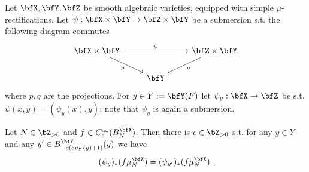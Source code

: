 \documentclass[12pt,a4paper]{amsart}%
\begin{document}
\begin{lemma}\label{lem:fiber.const}
    Let $\bfX,\bfY,\bfZ$ be smooth algebraic varieties, equipped with simple $\mu$-rectifications. Let $\psi:\bfX\times\bfY\to\bfZ\times\bfY$ be a submersion s.t. the following diagram commutes
    $$\begin{tikzcd}
\bfX\times \bfY \arrow[rr, "\psi"] \arrow[dr, "p"'] & & \bfZ\times \bfY \arrow[dl, "q"] \\
& \bfY &
\end{tikzcd}$$
    where $p,q$ are the projections. For $y\in Y:=\bfY(F)$ let $\psi_y:\bfX\to\bfZ$ be s.t. $\psi(x,y)=(\psi_y(x),y)$; note that $\psi_y$ is again a submersion.

    Let $N\in\Z_{>0}$ and $f\in C_c^\infty(B_N^{\bfX})$. Then there is $c\in\Z_{>0}$ s.t. for any $y\in Y$ and any $y'\in B_{-c(ov_Y(y)+1)}^{\bfY}(y)$ we have
    $$(\psi_y)_*(f\mu_N^{\bfX})=(\psi_{y'})_*(f\mu_N^{\bfX}).$$
\end{lemma}
\end{document}
